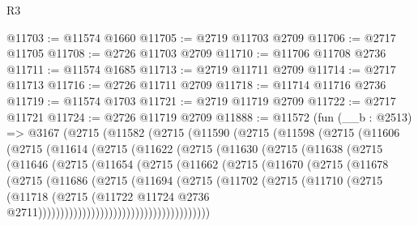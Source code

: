 \begin{lexlean}{R3}
\begin{coremodule}
@11703 := @11574 @1660
@11705 := @2719 @11703 @2709
@11706 := @2717 @11705
@11708 := @2726 @11703 @2709
@11710 := @11706 @11708 @2736
@11711 := @11574 @1685
@11713 := @2719 @11711 @2709
@11714 := @2717 @11713
@11716 := @2726 @11711 @2709
@11718 := @11714 @11716 @2736
@11719 := @11574 @1703
@11721 := @2719 @11719 @2709
@11722 := @2717 @11721
@11724 := @2726 @11719 @2709
@11888 := @11572
    (fun (__b : @2513) =>
    @3167
      (@2715
        (@11582
          (@2715
            (@11590
              (@2715
                (@11598
                  (@2715
                    (@11606
                      (@2715
                        (@11614
                          (@2715
                            (@11622
                              (@2715
                                (@11630
                                  (@2715
                                    (@11638
                                      (@2715
                                        (@11646
                                          (@2715
                                            (@11654
                                              (@2715
                                                (@11662
                                                  (@2715
                                                    (@11670
                                                      (@2715
                                                        (@11678
                                                          (@2715
                                                            (@11686
                                                              (@2715
                                                                (@11694
                                                                  (@2715
                                                                    (@11702
                                                                      (@2715
                                                                        (@11710
                                                                          (@2715
                                                                            (@11718
                                                                              (@2715
                                                                                (@11722
                                                                                  @11724
                                                                                  @2736
                                                                                  @2711)))))))))))))))))))))))))))))))))))))))

\end{coremodule}
\end{lexlean}
